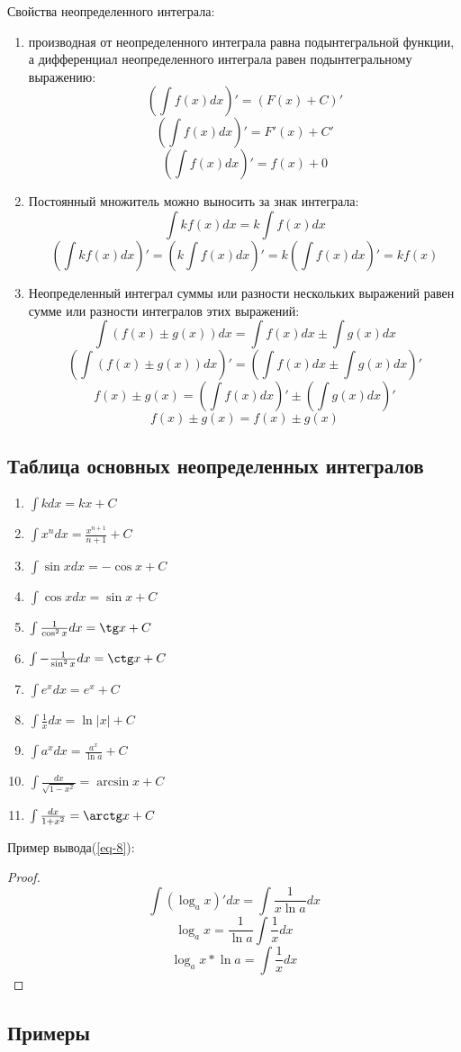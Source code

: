 \documentclass[12pt,a4paper]{article}
\begin{document}
Свойства неопределенного интеграла:
\begin{enumerate}
\item{производная от неопределенного интеграла равна подынтегральной функции, а дифференциал неопределенного интеграла равен подынтегральному выражению:
\[ (\int f(x)dx)' = (F(x) + C)' \]
\[ (\int f(x)dx)' = F'(x) + C' \]
\[ (\int f(x)dx)' = f(x) + 0 \]
}
\item{
Постоянный множитель можно выносить за знак интеграла:
\[ \int kf(x)dx = k \int f(x)dx \]
\[ (\int kf(x)dx)' = (k \int f(x)dx)' = k( \int f(x)dx)' = kf(x) \]
}
\item{
Неопределенный интеграл суммы или разности нескольких выражений равен сумме или разности интегралов этих выражений:
\[ \int (f(x) \pm g(x))dx = \int f(x)dx \pm \int g(x)dx \]
}
\[ (\int(f(x) \pm g(x))dx)' = (\int f(x)dx \pm \int g(x)dx )'  \]
\[ f(x) \pm g(x) = (\int f(x)dx)' \pm (\int g(x)dx)' \]
\[ f(x) \pm g(x) = f(x) \pm g(x) \]
\end{enumerate}
\subsection{Таблица основных неопределенных интегралов}

\begin{enumerate}[leftmargin=*, itemsep=0.4ex, before={\everymath{\displaystyle}}]%
\item{
$\int kdx = kx + C$
}
\item{
$\int x^ndx = \frac{x^{n + 1}}{n + 1} + C$
}
\item{
$\int \sin xdx = - \cos x + C$
}
\item{
$\int \cos xdx = \sin x + C$
}
\item{
$\int \frac{1}{\cos^2 x}dx = \tg x + C$
}
\item{
$\int - \frac{1}{\sin^2 x} dx = \ctg x + C$
}
\item{
$\int e^x dx = e^x + C$
}
\item{
$\int \frac{1}{x}dx = \ln |x| + C$
} \label{eq-8}
\item{
$\int a^xdx = \frac{a^x}{\ln a} + C$
}
\item{
$\int \frac{dx}{\sqrt{1 - x^2}} = \arcsin x + C$
}
\item{
$\int \frac{dx}{1 + x^2} = \arctg x + C$
}
\end{enumerate}
 Пример вывода(\ref{eq-8}):
\begin{proof}
\[ \int (\log_{a} x)'dx = \int \frac{1}{x \ln a}dx\]
\[ \log_{a} x = \frac {1}{\ln a} \int \frac{1}{x} dx \]
\[ \log_{a} x * \ln a = \int \frac{1}{x} dx \]
\end{proof}

\subsection{Примеры}
\end{document}
